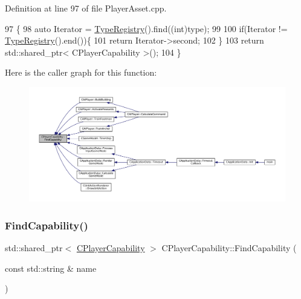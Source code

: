 Definition at line 97 of file Player\+Asset.\+cpp.


\begin{DoxyCode}
97                                                                                              \{
98     \textcolor{keyword}{auto} Iterator = \hyperlink{classCPlayerCapability_ab7fee932703792663278b1b2128f00f3}{TypeRegistry}().find((\textcolor{keywordtype}{int})type);
99     
100     \textcolor{keywordflow}{if}(Iterator != \hyperlink{classCPlayerCapability_ab7fee932703792663278b1b2128f00f3}{TypeRegistry}().end())\{
101         \textcolor{keywordflow}{return} Iterator->second;   
102     \}
103     \textcolor{keywordflow}{return} std::shared\_ptr< CPlayerCapability >();
104 \}
\end{DoxyCode}
Here is the caller graph for this function\+:
\nopagebreak
\begin{figure}[H]
\begin{center}
\leavevmode
\includegraphics[width=350pt]{classCPlayerCapability_a881ba4b87385d7cfe5cb6ced2d26f226_icgraph}
\end{center}
\end{figure}
\hypertarget{classCPlayerCapability_aca2e1bf2f3dfdced2ff12f922aa52a30}{}\label{classCPlayerCapability_aca2e1bf2f3dfdced2ff12f922aa52a30} 
\subsubsection{\texorpdfstring{Find\+Capability()}{FindCapability()}\hspace{0.1cm}{\footnotesize\ttfamily [2/2]}}
{\footnotesize\ttfamily std\+::shared\+\_\+ptr$<$ \hyperlink{classCPlayerCapability}{C\+Player\+Capability} $>$ C\+Player\+Capability\+::\+Find\+Capability (\begin{DoxyParamCaption}\item[{const std\+::string \&}]{name }\end{DoxyParamCaption})\hspace{0.3cm}{\ttfamily [static]}}



